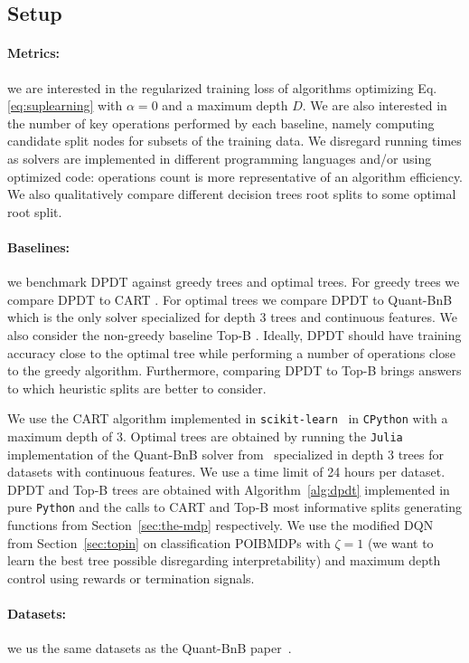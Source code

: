 \subsection{Setup}
\paragraph{Metrics:} we are interested in the regularized training loss of algorithms optimizing Eq.\ref{eq:suplearning} with $\alpha=0$ and a maximum depth $D$. We are also interested in the number of key operations performed by each baseline, namely computing candidate split nodes for subsets of the training data. We disregard running times as solvers are implemented in different programming languages and/or using optimized code: operations count is more representative of an algorithm efficiency. We also qualitatively compare different decision trees root splits to some optimal root split.
\paragraph{Baselines:} we benchmark DPDT against greedy trees and optimal trees. For greedy trees we compare DPDT to CART \cite{breiman1984classification}. For optimal trees we compare DPDT to Quant-BnB \cite{quantbnb} which is the only solver specialized for depth 3 trees and continuous features. We also consider the non-greedy baseline Top-B \cite{topk}. Ideally, DPDT should have training accuracy close to the optimal tree while performing a number of operations close to the greedy algorithm. Furthermore, comparing DPDT to Top-B brings answers to which heuristic splits are better to consider. 

We use the CART algorithm implemented in \texttt{scikit-learn}~\cite{scikit-learn} in \texttt{CPython} with a maximum depth of 3. Optimal trees are obtained by running the \texttt{Julia} implementation of the Quant-BnB solver from~\cite{quantbnb} specialized in depth 3 trees for datasets with continuous features. We use a time limit of 24 hours per dataset. 
DPDT and Top-B trees are obtained with Algorithm~\ref{alg:dpdt} implemented in pure \texttt{Python} and the calls to CART and Top-B most informative splits generating functions from Section~\ref{sec:the-mdp} respectively.
We use the modified DQN from Section~\ref{sec:topin} on classification POIBMDPs with $\zeta=1$ (we want to learn the best tree possible disregarding interpretability) and maximum depth control using rewards or termination signals.
\paragraph{Datasets:} we us the same datasets as the Quant-BnB paper~\cite{quantbnb}.

